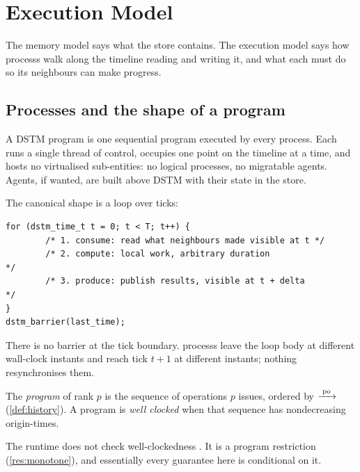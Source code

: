 \section{Execution Model}
\label{sec:execution-model}

The memory model says what the store contains. The execution model says how
\glspl{process} walk along the timeline reading and writing it, and what each
must do so its neighbours can make progress.

\subsection{Processes and the shape of a program}
\label{sec:exec-shape}

A DSTM program is one sequential program executed by every process. Each runs
a single thread of control, occupies one point on the timeline at a time, and
hosts no virtualised sub-entities: no logical processes, no migratable agents.
Agents, if wanted, are built above DSTM with their state in the \gls{store}.

The canonical shape is a loop over ticks:

\begin{lstlisting}
for (dstm_time_t t = 0; t < T; t++) {
        /* 1. consume: read what neighbours made visible at t */
        /* 2. compute: local work, arbitrary duration                */
        /* 3. produce: publish results, visible at t + delta         */
}
dstm_barrier(last_time);
\end{lstlisting}

There is no \gls{barrier} at the tick boundary. \Glspl{process} leave the loop
body at different wall-clock instants and reach tick $t+1$ at different
instants; nothing resynchronises them.

\begin{definition}[Program]\label{def:program}
The \emph{program} of rank $p$ is the sequence of \glspl{operation} $p$ issues,
ordered by $\xrightarrow{\;\mathrm{po}\;}$ (\cref{def:history}). A program is \emph{well clocked} when
that sequence has nondecreasing \glspl{origin-time}.
\end{definition}

The runtime does not check well-clockedness . It
is a program restriction (\cref{res:monotone}), and essentially every
guarantee here is conditional on it.

